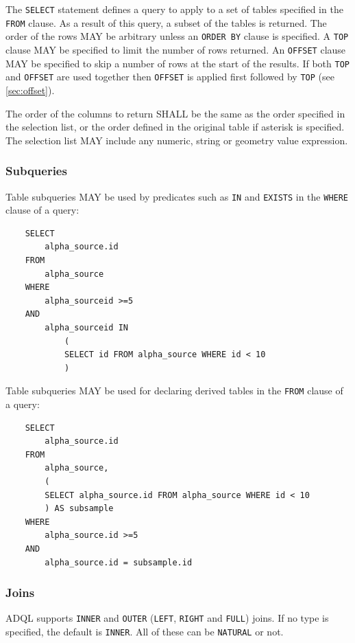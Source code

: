 \documentclass[11pt,a4paper]{ivoa}
\begin{document}
The \verb:SELECT: statement defines a query to apply to a set of tables specified
in the \verb:FROM: clause. As a result of this query, a subset of the tables
is returned.
The order of the rows MAY be arbitrary unless an \verb:ORDER BY: clause is specified.
A \verb:TOP: clause MAY be specified to limit the number of rows returned. 
An \verb:OFFSET: clause MAY be specified to skip a number of rows at the start
of the results.
If both \verb:TOP: and \verb:OFFSET: are used together then \verb:OFFSET: is applied
first followed by \verb:TOP: (see \ref{sec:offset}). 

The order of the columns to return SHALL be the same as the
order specified in the selection list, or the order defined in the original
table if asterisk is specified. The selection list MAY include any numeric,
string or geometry value expression.

\subsubsection{Subqueries}
\label{sec:subqueries}

Table subqueries MAY be used by predicates such as \verb:IN: and \verb:EXISTS:
in the \verb:WHERE: clause of a query:

\begin{verbatim}
    SELECT
        alpha_source.id
    FROM 
        alpha_source
    WHERE
        alpha_sourceid >=5
    AND
        alpha_sourceid IN 
            (
            SELECT id FROM alpha_source WHERE id < 10
            )
\end{verbatim}

Table subqueries MAY be used for declaring derived tables in the \verb:FROM: clause
of a query:

\begin{verbatim}
    SELECT
        alpha_source.id
    FROM
        alpha_source,
        (
        SELECT alpha_source.id FROM alpha_source WHERE id < 10
        ) AS subsample
    WHERE
        alpha_source.id >=5
    AND
        alpha_source.id = subsample.id
\end{verbatim}

\subsubsection{Joins}
\label{sec:joins}

ADQL supports \verb:INNER: and \verb:OUTER:
(\verb:LEFT:, \verb:RIGHT: and \verb:FULL:) joins. If no type is specified, the
default is \verb:INNER:. All of these can be \verb:NATURAL: or not.
\end{document}
